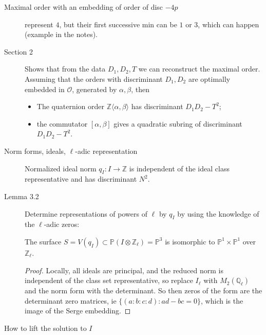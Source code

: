 \documentclass[12pt]{report}
\newcommand{\Q}{\mathbb{Q}}
\newcommand{\Z}{\mathbb{Z}}
\renewcommand{\O}{\mathcal{O}}
\begin{document}
\begin{description}
\item[Maximal order with an embedding of order of disc $-4p$] represent $4$, but their first successive min can be $1$ or $3$, which can happen (example in the notes).


\item[Section 2] Shows that from the data $D_1, D_2, T$ we can reconstruct the maximal order. Assuming that the orders with discriminant $D_1, D_2$ are optimally embedded in $\O$, generated by $\alpha, \beta$, then 

\begin{itemize}
\item The quaternion order $\Z \langle \alpha, \beta \rangle$ has discriminant $D_1D_2 - T^2$;
\item the commutator $[\alpha, \beta]$ gives a quadratic subring of discriminant $D_1D_2 - T^2 $.
\end{itemize}


\item[Norm forms, ideals, $\ell$-adic representation]

Normalized ideal norm $q_I : I \rightarrow \Z$ is independent of the ideal class representative and has discriminant $N^2$.

\item[Lemma 3.2] Determine representations of powers of $\ell$ by $q_I$ by using the knowledge of the $\ell$-adic zeros:

The surface $S = V(q_I) \subset \mathbb{P}(I\otimes \Z_\ell) = \mathbb{P}^3$ is isomorphic to $\mathbb{P}^1 \times \mathbb{P}^1$ over $\Z_\ell$.

\begin{proof}
Locally, all ideals are principal, and the reduced norm is independent of the class set representative, so replace $I_\ell$ with $M_2 (\Q_\ell)$ and the norm form with the determinant. So then zeros of the form are the determinant zero matrices, ie $\{(a:b:c:d) : ad-bc = 0\}$, which is the image of the Serge embedding. 
\end{proof} 

\item[How to lift the solution to $I$] 

\end{description}
\end{document}
